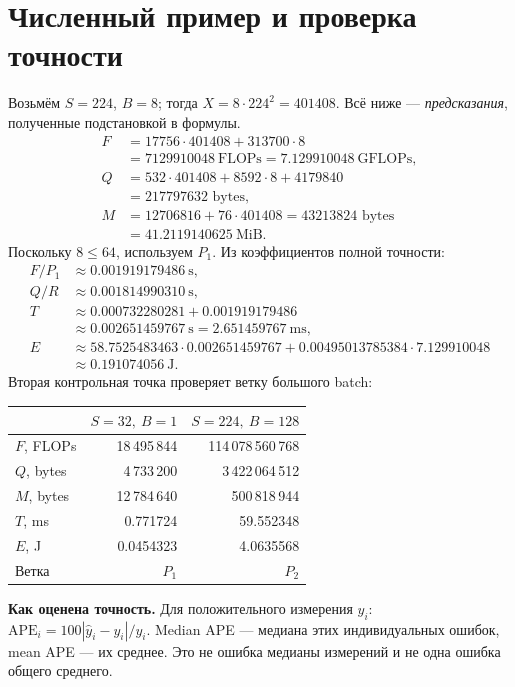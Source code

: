 \documentclass[11pt,a4paper]{article}
\newcommand{\bytes}{\text{ bytes}}
\newcommand{\page}[1]{\clearpage\section{#1}}
\begin{document}
\page{Численный пример и проверка точности}
Возьмём $S=224$, $B=8$; тогда $X=8\cdot224^2=401408$.
Всё ниже --- \emph{предсказания}, полученные подстановкой в формулы.
\begin{align*}
 F&=17756\cdot401408+313700\cdot8\\
  &=7129910048\ \text{FLOPs}=7.129910048\ \text{GFLOPs},\\
 Q&=532\cdot401408+8592\cdot8+4179840\\
  &=217797632\bytes,\\
 M&=12706816+76\cdot401408=43213824\bytes\\
  &=41.2119140625\ \mathrm{MiB}.
\end{align*}
Поскольку $8\le64$, используем $P_1$. Из коэффициентов полной точности:
\begin{align*}
 F/P_1&\approx0.001919179486\ \text{s},\\
 Q/R&\approx0.001814990310\ \text{s},\\
 T&\approx0.000732280281+0.001919179486\\
  &\approx0.002651459767\ \text{s}=2.651459767\ \text{ms},\\
 E&\approx58.7525483463\cdot0.002651459767
     +0.00495013785384\cdot7.129910048\\
  &\approx0.191074056\ \text{J}.
\end{align*}
Вторая контрольная точка проверяет ветку большого batch:
\begin{center}\small
\begin{tabular}{lrr}
\toprule
 & $S=32,\ B=1$ & $S=224,\ B=128$ \\
\midrule
$F$, FLOPs & 18\,495\,844 & 114\,078\,560\,768 \\
$Q$, bytes & 4\,733\,200 & 3\,422\,064\,512 \\
$M$, bytes & 12\,784\,640 & 500\,818\,944 \\
$T$, ms & 0.771724 & 59.552348 \\
$E$, J & 0.0454323 & 4.0635568 \\
Ветка & $P_1$ & $P_2$ \\
\bottomrule
\end{tabular}\end{center}

\textbf{Как оценена точность.} Для положительного измерения $y_i$:
$\mathrm{APE}_i=100|\widehat y_i-y_i|/y_i$.
Median APE --- медиана этих индивидуальных ошибок, mean APE --- их среднее.
Это не ошибка медианы измерений и не одна ошибка общего среднего.
\end{document}
